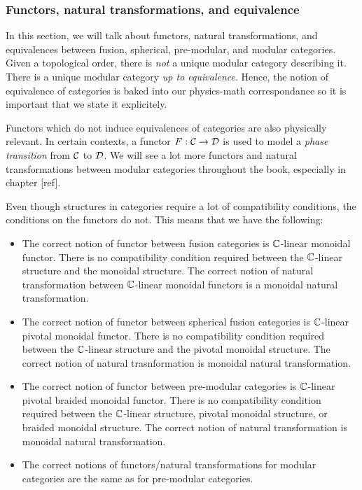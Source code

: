 \subsubsection{Functors, natural transformations, and equivalence}

In this section, we will talk about functors, natural transformations, and equivalences between fusion, spherical, pre-modular, and modular categories. Given a topological order, there is {\em not} a unique modular category describing it. There is a unique modular category {\em up to equivalence}. Hence, the notion of equivalence of categories is baked into our physics-math correspondance so it is important that we state it explicitely.

Functors which do not induce equivalences of categories are also physically relevant. In certain contexts, a functor $F:{\mathcal C}\to {\mathcal D}$ is used to model a {\em phase transition} from ${\mathcal C}$ to ${\mathcal D}$. We will see a lot more functors and natural transformations between modular categories throughout the book, especially in chapter [ref].

Even though structures in categories require a lot of compatibility conditions, the conditions on the functors do not. This means that we have the following:

\begin{itemize}
\item The correct notion of functor between fusion categories is ${\mathbb C}$-linear monoidal functor. There is no compatibility condition required between the ${\mathbb C}$-linear structure and the monoidal structure. The correct notion of natural transformation between ${\mathbb C}$-linear monoidal functors is a monoidal natural transformation.

\item The correct notion of functor between spherical fusion categories is ${\mathbb C}$-linear pivotal monoidal functor. There is no compatibility condition required between the ${\mathbb C}$-linear structure and the pivotal monoidal structure. The correct notion of natural trasnformation is monoidal natural transformation.

\item The correct notion of functor between pre-modular categories is ${\mathbb C}$-linear pivotal braided monoidal functor. There is no compatibility condition required between the ${\mathbb C}$-linear structure, pivotal monoidal structure, or braided monoidal structure. The correct notion of natural transformation is monoidal natural transformation.

\item The correct notions of functors/natural transformations for modular categories are the same as for pre-modular categories.

\end{itemize}


